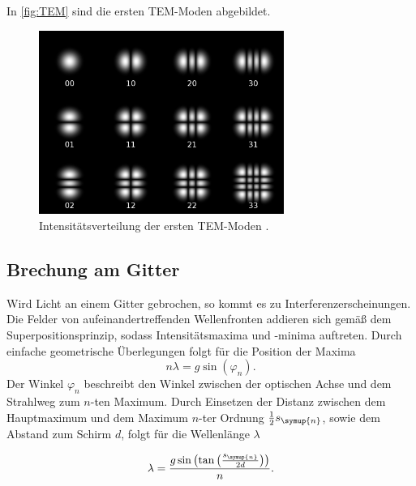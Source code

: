 In \autoref{fig:TEM} sind die ersten TEM-Moden abgebildet.
\begin{figure}
    \centering
    \includegraphics[height=6cm]{content/pics/TEM.png}
    \caption{Intensitätsverteilung der ersten TEM-Moden \cite{TEM-Moden}.}
    \label{fig:TEM}
\end{figure}

\subsection{Brechung am Gitter}
Wird Licht an einem Gitter gebrochen, so kommt es zu Interferenzerscheinungen. Die Felder von aufeinandertreffenden Wellenfronten addieren sich gemäß dem
Superpositionsprinzip, sodass Intensitätsmaxima und -minima auftreten. Durch einfache geometrische Überlegungen folgt für die Position der Maxima
\begin{equation*}
    n \lambda = g \sin(\varphi_n).
\end{equation*}
Der Winkel $\varphi_n$ beschreibt den Winkel zwischen der optischen Achse und dem Strahlweg zum $n$-ten Maximum. Durch Einsetzen der Distanz zwischen dem Hauptmaximum
und dem Maximum $n$-ter Ordnung $\frac{1}{2}s_{\symup{n}}$, sowie dem Abstand zum Schirm $d$, folgt für die Wellenlänge $\lambda$

\begin{equation}
    \lambda = \frac{g\sin\left(\tan\left(\frac{s_{\symup{n}}}{2d}\right)\right)}{n}.
    \label{eq:lambda}
\end{equation}